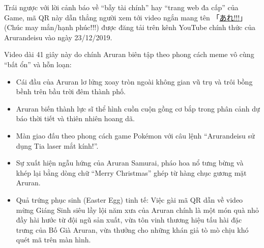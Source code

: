 \documentclass[../main.tex]{subfiles}
\begin{document}
Trái ngược với lời cảnh báo về ``bẫy tài chính'' hay ``trang web đa cấp'' của Game, mã QR này dẫn thẳng người xem tới video ngắn mang tên 「\href{https://youtu.be/Vwaq1gqLRUI}{あれ!!!}」 (Chúc may mắn/hạnh phúc!!!) được đăng tải trên kênh YouTube chính thức của Arurandeisu vào ngày 23/12/2019.

Video dài 41 giây này do chính Aruran biên tập theo phong cách meme vô cùng ``bất ổn'' và hỗn loạn:
\begin{itemize}
    \item Cái đầu của Aruran lơ lửng xoay tròn ngoài không gian vũ trụ và trôi bồng bềnh trên bầu trời đêm thành phố.
    \item Aruran biến thành lực sĩ thể hình cuồn cuộn gồng cơ bắp trong phân cảnh dự báo thời tiết và thiên nhiên hoang dã.
    \item Màn giao đấu theo phong cách game Pokémon với câu lệnh ``Arurandeisu sử dụng Tia laser mắt kính!''.
    \item Sự xuất hiện ngẫu hứng của Aruran Samurai, pháo hoa nổ tưng bừng và khép lại bằng dòng chữ ``Merry Christmas'' ghép từ hàng chục gương mặt Aruran.
    \item Quả trứng phục sinh (Easter Egg) tinh tế: Việc gài mã QR dẫn về video mừng Giáng Sinh siêu lầy lội năm xưa của Aruran chính là một món quà nhỏ đầy hài hước từ đội ngũ sản xuất, vừa tôn vinh thương hiệu tấu hài đặc trưng của Bố Già Aruran, vừa thưởng cho những khán giả tò mò chịu khó quét mã trên màn hình.
\end{itemize}
\end{document}
